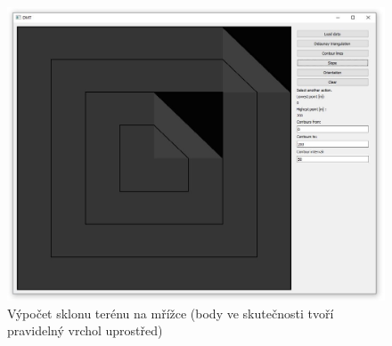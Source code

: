 \documentclass{article}
\begin{document}
\begin{figure}[htb]
\centering
        \includegraphics[trim=0cm 0cm 0cm 0cm, width=1\textwidth]{grid_slope.jpg}
        \caption{Výpočet sklonu terénu na mřížce (body ve skutečnosti tvoří pravidelný vrchol uprostřed)}
\end{figure}

	

\clearpage

\end{document}
